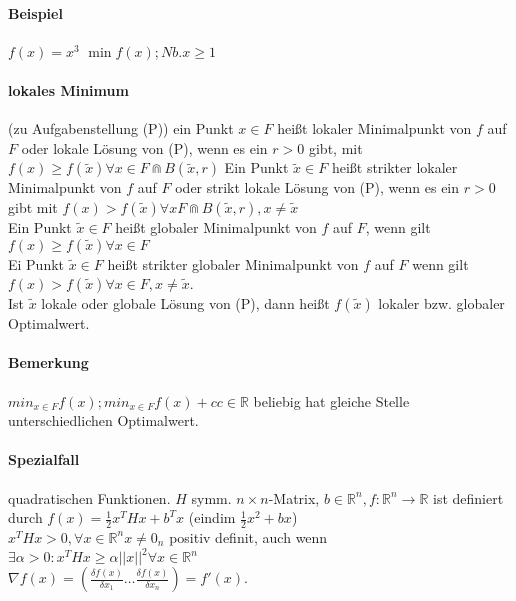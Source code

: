 \documentclass[ngerman,halfparskip]{scrartcl}
\theoremstyle{definition}
\newcommand*{\R}{\mathbb{R}}      %
\begin{document}
\paragraph[1.1.3]{Beispiel}
$f(x)=x^3$ $\min f(x); Nb. x\geq 1$
\paragraph[Def 1.1.4]{lokales Minimum} (zu Aufgabenstellung (P)) ein Punkt $x\in F$ heißt lokaler Minimalpunkt von $f$ auf $F$ oder lokale Lösung von (P), wenn es ein $r>0$ gibt, mit $f(x)\geq f(\tilde x)\forall x\in F \Cap B(\tilde x,r)$ Ein Punkt $\tilde x\in F$ heißt strikter lokaler Minimalpunkt von $f$ auf $F$ oder strikt lokale Lösung von (P), wenn es ein $r>0$ gibt mit $f(x)>f(\tilde x)\forall x F\Cap B(\tilde x,r), x\neq \tilde x$ \\
Ein Punkt $\tilde{x} \in F$ heißt globaler Minimalpunkt von $f$ auf $F$, wenn gilt $f(x)\geq f(\tilde{x})\forall x\in F$\\
Ei Punkt $ \tilde x \in F$ heißt strikter globaler Minimalpunkt von $f$ auf $F$ wenn gilt $ f(x) >f(\tilde x) \forall x\in F, x\neq \tilde x$.\\
Ist $\tilde x$ lokale oder globale Lösung von (P), dann heißt $f(\tilde x)$ lokaler bzw. globaler Optimalwert.
\paragraph*{Bemerkung} $min_{x\in F} f(x); min_{x\in F} f(x)+c c\in\R$ beliebig hat gleiche Stelle unterschiedlichen Optimalwert.
\paragraph*{Spezialfall} quadratischen Funktionen. $H$ symm. $n\times n$-Matrix, $b\in\R^n, f: \R^n\rightarrow \R$ ist definiert durch $f(x)=\frac 12 x^THx+b^Tx$ (eindim $\frac 12 x^2 +bx$)\\
$x^THx>0, \forall x\in \R^n x\neq 0_n$ positiv definit, auch wenn $\exists\alpha >0: x^THx \geq \alpha ||x||^2\forall x\in\R^n$\\
$\nabla f(x)=(\frac{\delta f(x)}{\delta x_1} \ldots \frac{\delta f(x)}{\delta x_n})=f'(x)$.
\end{document}
